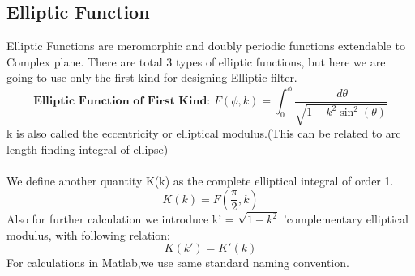 \documentclass{article}
\begin{document}
\subsection{Elliptic Function}
Elliptic Functions are meromorphic and doubly periodic functions extendable to Complex plane.
There are total 3 types of elliptic functions, but here we are going to use only the first kind for designing Elliptic filter.
\begin{equation}
    \textbf{Elliptic Function of First Kind: }
    F(\phi,k) = \int_{0}^{\phi} \frac{\,d\theta}{\sqrt{1-k^2\sin^2(\theta)}} 
\end{equation}
k is also called the eccentricity or elliptical modulus.(This can be related to arc length finding integral of ellipse)\\
\\
We define another quantity K(k) as the complete elliptical integral of order 1.
\begin{equation}
    K(k) = F(\frac{\pi}{2},k)
\end{equation}
Also for further calculation we introduce k' = $\sqrt{1-k^2}$ 'complementary elliptical modulus, with following relation:
\begin{equation*}
    K(k') = K'(k)
\end{equation*}
For calculations in Matlab,we use same standard naming convention.
\end{document}
